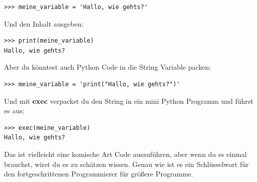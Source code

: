 \begin{Verbatim}[frame=single]
>>> meine_variable = 'Hallo, wie gehts?'
\end{Verbatim}

\noindent
Und den Inhalt ausgeben:

\begin{Verbatim}[frame=single]
>>> print(meine_variable)
Hallo, wie gehts?
\end{Verbatim}

\noindent
Aber du könntest auch Python Code in die String Variable packen:

\begin{Verbatim}[frame=single]
>>> meine_variable = 'print("Hallo, wie gehts?")'
\end{Verbatim}

\noindent
Und mit \textbf{exec} verpackst du den String in ein mini Python Programm und führst es aus:

\begin{Verbatim}[frame=single]
>>> exec(meine_variable)
Hallo, wie gehts?
\end{Verbatim}

Das ist vielleicht eine komische Art Code auszuführen, aber wenn du es einmal brauchst, wirst du es zu schätzen wissen. Genau wie  ist es ein Schlüsselwort für den fortgeschrittenen Programmierer für größere Programme.

